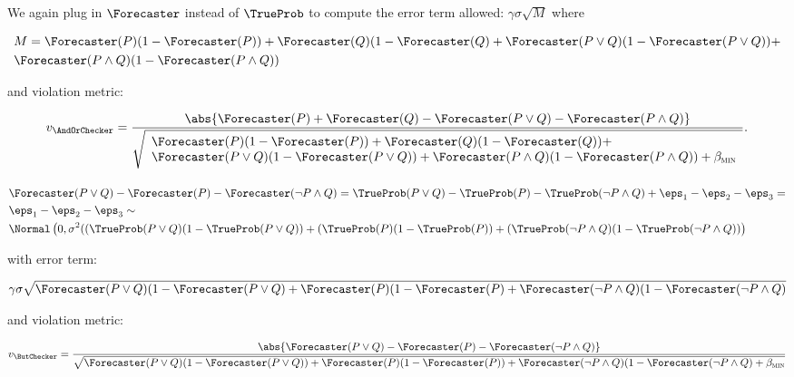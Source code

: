 We again plug in $\Forecaster$ instead of $\TrueProb$ to compute the error term allowed: $\gamma \sigma \sqrt{M}$ where

\begin{align*}
    &M = \Forecaster(P)(1 - \Forecaster(P)) + \Forecaster(Q)(1 - \Forecaster(Q) + \Forecaster(P \lor Q)(1 - \Forecaster(P \lor Q)) + \\
    &\Forecaster(P \land Q)(1 - \Forecaster(P \land Q))
\end{align*}

and violation metric:

\begin{align*}
    v_{\AndOrChecker}
    = \frac{\abs{\Forecaster(P) + \Forecaster(Q) - \Forecaster(P \lor Q) - \Forecaster(P \land Q)}}{
        \sqrt{\begin{array}{l}
            \Forecaster(P)(1 - \Forecaster(P)) + \Forecaster(Q)(1 - \Forecaster(Q)) + \\
            \Forecaster(P \lor Q)(1 - \Forecaster(P \lor Q)) + \Forecaster(P \land Q)(1 - \Forecaster(P \land Q)) + \betamin
        \end{array}}
    }.
\end{align*}

\paragraph{\ButChecker}

\begin{align*}
   &\Forecaster(P \lor Q) - \Forecaster(P) - \Forecaster(\lnot P \land Q) =
   \TrueProb(P \lor Q) - \TrueProb(P) - \TrueProb(\lnot P \land Q) + \eps_1 - \eps_2 - \eps_3 =\\
   &\eps_1 - \eps_2 - \eps_3 \sim\\
   &\Normal\left(0, \sigma^2 ((\TrueProb(P \lor Q)(1 - \TrueProb(P \lor Q)) + (\TrueProb(P)(1 - \TrueProb(P)) + (\TrueProb(\lnot P \land Q)(1 - \TrueProb(\lnot P \land Q)) \right)
\end{align*}

with error term:

\begin{align*}
    \gamma \sigma \sqrt{\Forecaster(P \lor Q)(1 - \Forecaster(P \lor Q) + \Forecaster(P)(1 - \Forecaster(P) + \Forecaster(\lnot P \land Q)(1 - \Forecaster(\lnot P \land Q)}
\end{align*}

and violation metric:

\begin{align*}
    v_{\ButChecker}
    = \frac{\abs{\Forecaster(P \lor Q) - \Forecaster(P) - \Forecaster(\lnot P \land Q)}}{
        \sqrt{\Forecaster(P \lor Q)(1 - \Forecaster(P \lor Q)) + \Forecaster(P)(1 - \Forecaster(P)) + \Forecaster(\lnot P \land Q)(1 - \Forecaster(\lnot P \land Q)+ \betamin}
    }
\end{align*}


